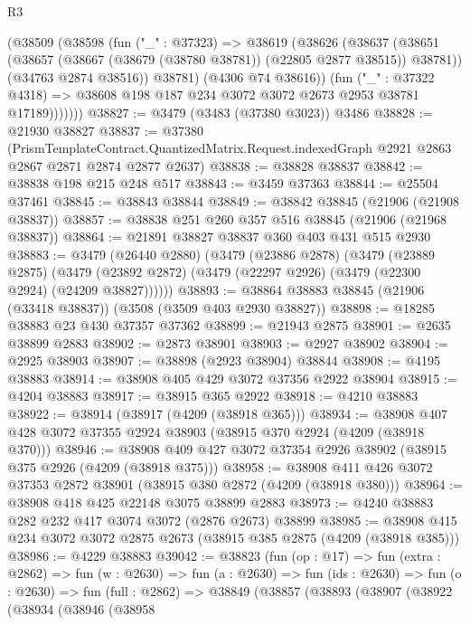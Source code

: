 \begin{lexlean}{R3}
\begin{coremodule}
            (@38509
              (@38598
                (fun ("_" : @37323) =>
                @38619
                  (@38626
                    (@38637
                      (@38651
                        (@38657 (@38667 (@38679 (@38780 @38781)) (@22805 @2877 @38515)) @38781))
                      (@34763 @2874 @38516))
                    @38781)
                  (@4306 @74 @38616))
                (fun ("_" : @37322 @4318) =>
                @38608 @198 @187 @234 @3072 @3072 @2673 @2953 @38781 @17189)))))))
@38827 := @3479 (@3483 (@37380 @3023)) @3486
@38828 := @21930 @38827
@38837 := @37380
    (PrismTemplateContract.QuantizedMatrix.Request.indexedGraph
      @2921
      @2863
      @2867
      @2871
      @2874
      @2877
      @2637)
@38838 := @38828 @38837
@38842 := @38838 @198 @215 @248 @517
@38843 := @3459 @37363
@38844 := @25504 @37461
@38845 := @38843 @38844
@38849 := @38842 @38845 (@21906 (@21908 @38837))
@38857 := @38838 @251 @260 @357 @516 @38845 (@21906 (@21968 @38837))
@38864 := @21891 @38827 @38837 @360 @403 @431 @515 @2930
@38883 := @3479
    (@26440 @2880)
    (@3479
      (@23886 @2878)
      (@3479
        (@23889 @2875)
        (@3479 (@23892 @2872) (@3479 (@22297 @2926) (@3479 (@22300 @2924) (@24209 @38827))))))
@38893 := @38864 @38883 @38845 (@21906 (@33418 @38837)) (@3508 (@3509 @403 @2930 @38827))
@38898 := @18285 @38883 @23 @430 @37357 @37362
@38899 := @21943 @2875
@38901 := @2635 @38899 @2883
@38902 := @2873 @38901
@38903 := @2927 @38902
@38904 := @2925 @38903
@38907 := @38898 (@2923 @38904) @38844
@38908 := @4195 @38883
@38914 := @38908 @405 @429 @3072 @37356 @2922 @38904
@38915 := @4204 @38883
@38917 := @38915 @365 @2922
@38918 := @4210 @38883
@38922 := @38914 (@38917 (@4209 (@38918 @365)))
@38934 := @38908 @407 @428 @3072 @37355 @2924 @38903 (@38915 @370 @2924 (@4209 (@38918 @370)))
@38946 := @38908 @409 @427 @3072 @37354 @2926 @38902 (@38915 @375 @2926 (@4209 (@38918 @375)))
@38958 := @38908 @411 @426 @3072 @37353 @2872 @38901 (@38915 @380 @2872 (@4209 (@38918 @380)))
@38964 := @38908 @418 @425 @22148 @3075 @38899 @2883
@38973 := @4240 @38883 @282 @232 @417 @3074 @3072 (@2876 @2673) @38899
@38985 := @38908 @415 @234 @3072 @3072 @2875 @2673 (@38915 @385 @2875 (@4209 (@38918 @385)))
@38986 := @4229 @38883
@39042 := @38823
    (fun (op : @17) =>
    fun (extra : @2862) =>
    fun (w : @2630) =>
    fun (a : @2630) =>
    fun (ids : @2630) =>
    fun (o : @2630) =>
    fun (full : @2862) =>
    @38849
      (@38857
        (@38893
          (@38907
            (@38922
              (@38934
                (@38946
                  (@38958

\end{coremodule}
\end{lexlean}
